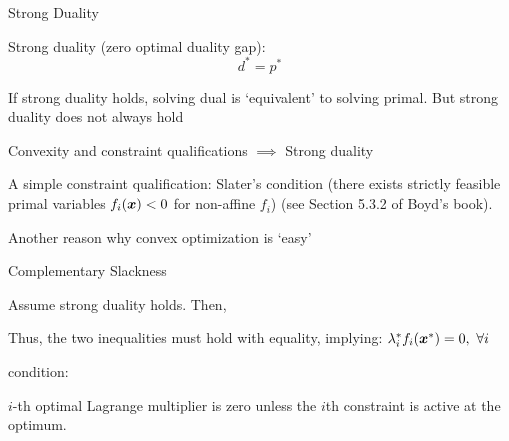 \documentclass[handout,fleqn,aspectratio=169]{beamer}
\begin{document}
\begin{frame}{Strong Duality}

\plitemsep 0.1in

\bci 

\item {\blue Strong duality} (zero optimal duality gap):
\[
d^{*}=p^{*}
\]

\item If strong duality holds, solving dual is `equivalent' to solving
primal. But strong duality does {\red not} always hold

\item Convexity and {\blue constraint qualifications} $\implies$
Strong duality

\item A simple constraint qualification: {\blue Slater's condition}
(there exists strictly feasible primal variables $f_{i}(\bm{x})<0$ for
non-affine $f_{i}$) (see Section 5.3.2 of Boyd's book). 

\item Another reason why convex optimization is `easy'

\eci
\end{frame}


\begin{frame}{Complementary Slackness}

\plitemsep 0.05in

\bci 

\item Assume {\red strong duality} holds. Then, 

\item Thus, the two inequalities must hold with equality, implying:
$
\lambda_{i}^{*}f_{i}(\bm{x}^{*}) = 0, \ \forall i
$

\item {} condition:

\item $i$-th optimal Lagrange multiplier is zero unless the $i$th constraint is
active at the optimum. 

\eci

\end{frame}
\end{document}

